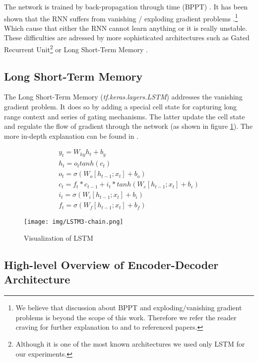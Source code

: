 The network is trained by back-propagation through time (BPPT) \citep{bpptWerbos1990}. It has been shown that the RNN suffers from vanishing / exploding gradient problems \citep{hochreiter1997}.\footnote{We believe that discussion about BPPT and exploding/vanishing gradient problems is beyond the scope of this work. Therefore we refer the reader craving for further explanation to \citep{Goodfellow-et-al-2016} and to referenced papers.} Which cause that either the RNN cannot learn anything or it is really unstable. These difficulties are adressed by more sophisticated architectures such as Gated Recurrent Unit\footnote{Although it is one of the most known architectures we used only LSTM for our experiments. } \citep{cho2014learning} or Long Short-Term Memory \citep{hochreiter1997}.


\subsection{Long Short-Term Memory}

The Long Short-Term Memory (\emph{tf.ke\-ras.lay\-ers.LSTM}) addresses the vanishing gradient problem. It does so by adding a special cell state for capturing long range context and series of gating mechanisms. The latter update the cell state and regulate the flow of gradient through the network (as shown in figure \ref{figure:visualization_lstm}). The more in-depth explanation can be found in \citep{Olah2015}.

\begin{figure}[!ht]
    \begin{gather}
        y_t = W_{hy}h_t + b_y \\
        h_t = o_t tanh(c_t) \\
        o_t = \sigma(W_o[h_{t-1};x_t] + b_o) \\
        c_t = f_t * c_{t-1} + i_t * tanh(W_c[h_{t-1}; x_t] + b_c)\\
        i_t = \sigma(W_i[h_{t-1}; x_t] + b_i)\\
        f_t = \sigma(W_f[h_{t-1}; x_t] + b_f)
    \end{gather}
\end{figure}
\begin{figure}[!ht]
    \centering
    \texttt{[image: img/LSTM3-chain.png]}
    \caption{Visualization of LSTM \citep{Olah2015}} \label{figure:visualization_lstm}
\end{figure}

\subsection{High-level Overview of Encoder-Decoder Architecture} \label{subsection:high_level_encoder_decoder}

